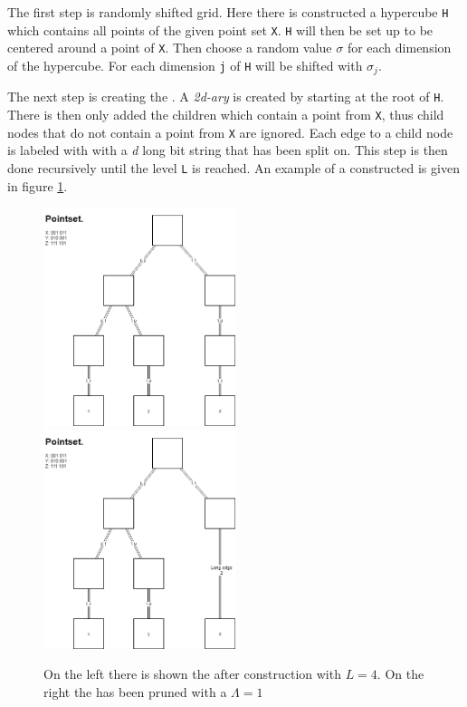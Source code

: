 The first step is randomly shifted grid. Here there is constructed a hypercube \texttt{H} which contains all points of the given point set \texttt{X}. \texttt{H} will then be set up to be centered around a point of \texttt{X}. Then choose a random value $\sigma$ for each dimension of the hypercube. For each dimension \texttt{j} of \texttt{H} will be shifted with $\sigma_j$.

The next step is creating the \qt{}. A \textit{2d-ary} \qt{} is created by starting at the root of \texttt{H}. There is then only added the children which contain a point from \texttt{X}, thus child nodes that do not contain a point from \texttt{X} are ignored. Each edge to a child node is labeled with with a \textit{d} long bit string that has been split on. This step is then done recursively until the level \texttt{L} is reached. An example of a constructed \qt{} is given in figure \ref{fig:quadtree}.

\begin{figure}

\includegraphics[width=0.5\textwidth]{figures/quadtree}
\includegraphics[width=0.5\textwidth]{figures/prunnedquadtree}
\caption{On the left there is shown the \qt{} after construction with $L=4$. On the right the \qt{} has been pruned with a $\Lambda = 1$}
\label{fig:quadtree}
\end{figure}



